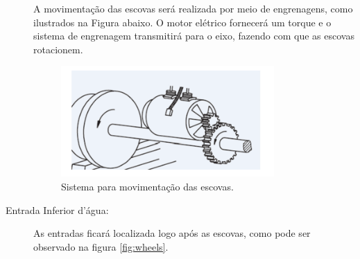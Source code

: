 \begin{description}
A movimentação das escovas será realizada por meio de engrenagens, como ilustrados
na Figura abaixo. O motor elétrico fornecerá um torque e o sistema de
engrenagem transmitirá para o eixo, fazendo com que as escovas rotacionem.
\par
\begin{figure}[h]
  \centering
  \includegraphics[width=0.8\textwidth]{figures/brush-system.png}
  \caption{Sistema para movimentação das escovas.}
  \label{fig:brush-system}
\end{figure}
\FloatBarrier

\item[Entrada Inferior d'água:] As entradas ficará localizada logo após as
escovas, como pode ser observado na figura \ref{fig:wheels}.


\end{description}
